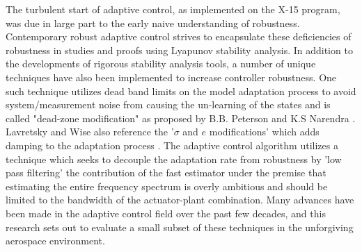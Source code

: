 The turbulent start of adaptive control, as implemented on the X-15 program, was due in large part to the early naive understanding of robustness.  Contemporary robust adaptive control strives to encapsulate these deficiencies of robustness in studies and proofs using Lyapunov stability analysis.  In addition to the developments of rigorous stability analysis tools, a number of unique techniques have also been implemented to increase controller robustness.  One such technique utilizes dead band limits on the model adaptation process to avoid system/measurement noise from causing the un-learning of the states and is called "dead-zone modification" as proposed by B.B. Peterson and K.S Narendra \cite{peterson1982bounded}.  Lavretsky and Wise also reference the '$\sigma$ and $e$ modifications' which adds damping to the adaptation process \cite{lavretsky2013robust}.  The \Lone adaptive control algorithm utilizes a technique which seeks to decouple the adaptation rate from robustness by 'low pass filtering' the contribution of the fast estimator under the premise that estimating the entire frequency spectrum is overly ambitious and should be limited to the bandwidth of the actuator-plant combination.  Many advances have been made in the adaptive control field over the past few decades, and this research sets out to evaluate a small subset of these techniques in the unforgiving aerospace environment.

